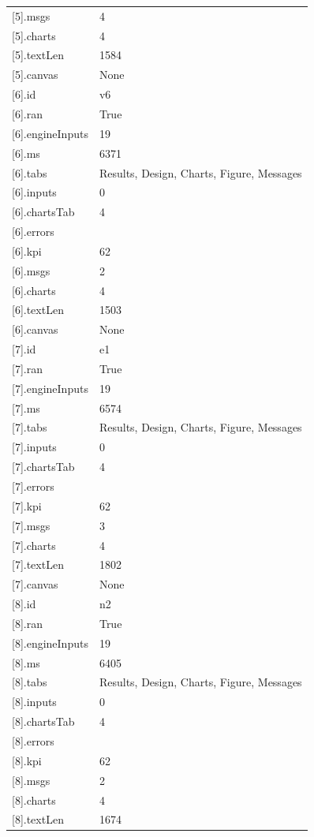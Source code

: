{\begin{longtable}{p{}p{}}
{}[5].msgs & 4\\
{}[5].charts & 4\\
{}[5].textLen & 1584\\
{}[5].canvas & None\\
{}[6].id & v6\\
{}[6].ran & True\\
{}[6].engineInputs & 19\\
{}[6].ms & 6371\\
{}[6].tabs & Results, Design, Charts, Figure, Messages\\
{}[6].inputs & 0\\
{}[6].chartsTab & 4\\
{}[6].errors & \\
{}[6].kpi & 62\\
{}[6].msgs & 2\\
{}[6].charts & 4\\
{}[6].textLen & 1503\\
{}[6].canvas & None\\
{}[7].id & e1\\
{}[7].ran & True\\
{}[7].engineInputs & 19\\
{}[7].ms & 6574\\
{}[7].tabs & Results, Design, Charts, Figure, Messages\\
{}[7].inputs & 0\\
{}[7].chartsTab & 4\\
{}[7].errors & \\
{}[7].kpi & 62\\
{}[7].msgs & 3\\
{}[7].charts & 4\\
{}[7].textLen & 1802\\
{}[7].canvas & None\\
{}[8].id & n2\\
{}[8].ran & True\\
{}[8].engineInputs & 19\\
{}[8].ms & 6405\\
{}[8].tabs & Results, Design, Charts, Figure, Messages\\
{}[8].inputs & 0\\
{}[8].chartsTab & 4\\
{}[8].errors & \\
{}[8].kpi & 62\\
{}[8].msgs & 2\\
{}[8].charts & 4\\
{}[8].textLen & 1674\\

\end{longtable}}

